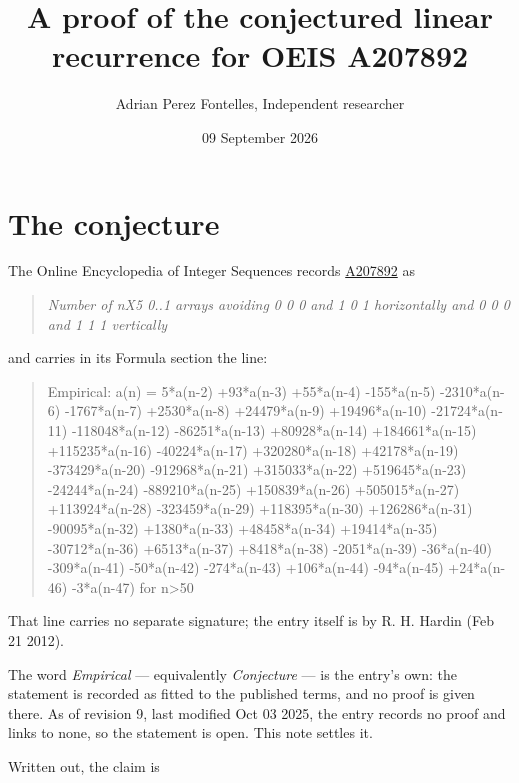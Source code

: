 \documentclass[11pt]{article}
\title{A proof of the conjectured linear recurrence for OEIS A207892}
\author{Adrian Perez Fontelles, Independent researcher}
\date{09 September 2026}
\theoremstyle{definition}
\begin{document}
\maketitle
\section{The conjecture}

The Online Encyclopedia of Integer Sequences records \href{https://oeis.org/A207892}{A207892} as

\begin{quote}\itshape Number of nX5 0..1 arrays avoiding 0 0 0 and 1 0 1 horizontally and 0 0 0 and 1 1 1 vertically\end{quote}

and carries in its Formula section the line:

\begin{quote}\ttfamily Empirical: a(n) = 5*a(n-2) +93*a(n-3) +55*a(n-4) -155*a(n-5) -2310*a(n-6) -1767*a(n-7) +2530*a(n-8) +24479*a(n-9) +19496*a(n-10) -21724*a(n-11) -118048*a(n-12) -86251*a(n-13) +80928*a(n-14) +184661*a(n-15) +115235*a(n-16) -40224*a(n-17) +320280*a(n-18) +42178*a(n-19) -373429*a(n-20) -912968*a(n-21) +315033*a(n-22) +519645*a(n-23) -24244*a(n-24) -889210*a(n-25) +150839*a(n-26) +505015*a(n-27) +113924*a(n-28) -323459*a(n-29) +118395*a(n-30) +126286*a(n-31) -90095*a(n-32) +1380*a(n-33) +48458*a(n-34) +19414*a(n-35) -30712*a(n-36) +6513*a(n-37) +8418*a(n-38) -2051*a(n-39) -36*a(n-40) -309*a(n-41) -50*a(n-42) -274*a(n-43) +106*a(n-44) -94*a(n-45) +24*a(n-46) -3*a(n-47) for n>50\end{quote}

That line carries no separate signature; the entry itself is by R. H. Hardin (Feb 21 2012).

The word {\itshape Empirical} --- equivalently {\itshape Conjecture} --- is the entry's own: the statement is recorded as fitted to the published terms, and no proof is given there. As of revision 9, last modified Oct 03 2025, the entry records no proof and links to none, so the statement is open. This note settles it.

Written out, the claim is
\end{document}
